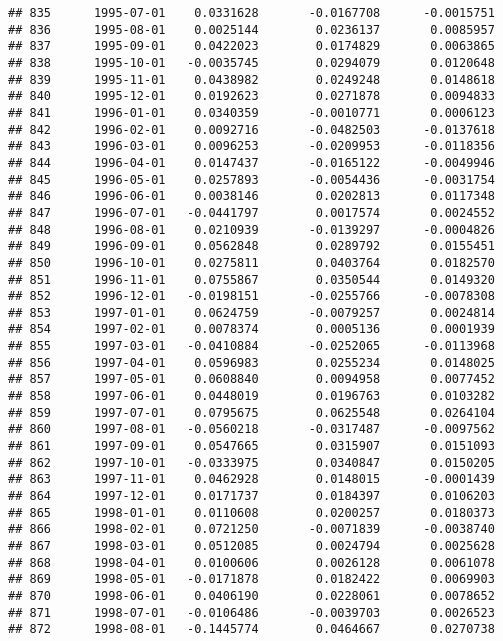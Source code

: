 \documentclass[
]{article}
\begin{document}
\begin{verbatim}
## 835      1995-07-01    0.0331628       -0.0167708      -0.0015751
## 836      1995-08-01    0.0025144        0.0236137       0.0085957
## 837      1995-09-01    0.0422023        0.0174829       0.0063865
## 838      1995-10-01   -0.0035745        0.0294079       0.0120648
## 839      1995-11-01    0.0438982        0.0249248       0.0148618
## 840      1995-12-01    0.0192623        0.0271878       0.0094833
## 841      1996-01-01    0.0340359       -0.0010771       0.0006123
## 842      1996-02-01    0.0092716       -0.0482503      -0.0137618
## 843      1996-03-01    0.0096253       -0.0209953      -0.0118356
## 844      1996-04-01    0.0147437       -0.0165122      -0.0049946
## 845      1996-05-01    0.0257893       -0.0054436      -0.0031754
## 846      1996-06-01    0.0038146        0.0202813       0.0117348
## 847      1996-07-01   -0.0441797        0.0017574       0.0024552
## 848      1996-08-01    0.0210939       -0.0139297      -0.0004826
## 849      1996-09-01    0.0562848        0.0289792       0.0155451
## 850      1996-10-01    0.0275811        0.0403764       0.0182570
## 851      1996-11-01    0.0755867        0.0350544       0.0149320
## 852      1996-12-01   -0.0198151       -0.0255766      -0.0078308
## 853      1997-01-01    0.0624759       -0.0079257       0.0024814
## 854      1997-02-01    0.0078374        0.0005136       0.0001939
## 855      1997-03-01   -0.0410884       -0.0252065      -0.0113968
## 856      1997-04-01    0.0596983        0.0255234       0.0148025
## 857      1997-05-01    0.0608840        0.0094958       0.0077452
## 858      1997-06-01    0.0448019        0.0196763       0.0103282
## 859      1997-07-01    0.0795675        0.0625548       0.0264104
## 860      1997-08-01   -0.0560218       -0.0317487      -0.0097562
## 861      1997-09-01    0.0547665        0.0315907       0.0151093
## 862      1997-10-01   -0.0333975        0.0340847       0.0150205
## 863      1997-11-01    0.0462928        0.0148015      -0.0001439
## 864      1997-12-01    0.0171737        0.0184397       0.0106203
## 865      1998-01-01    0.0110608        0.0200257       0.0180373
## 866      1998-02-01    0.0721250       -0.0071839      -0.0038740
## 867      1998-03-01    0.0512085        0.0024794       0.0025628
## 868      1998-04-01    0.0100606        0.0026128       0.0061078
## 869      1998-05-01   -0.0171878        0.0182422       0.0069903
## 870      1998-06-01    0.0406190        0.0228061       0.0078652
## 871      1998-07-01   -0.0106486       -0.0039703       0.0026523
## 872      1998-08-01   -0.1445774        0.0464667       0.0270738

\end{verbatim}
\end{document}
